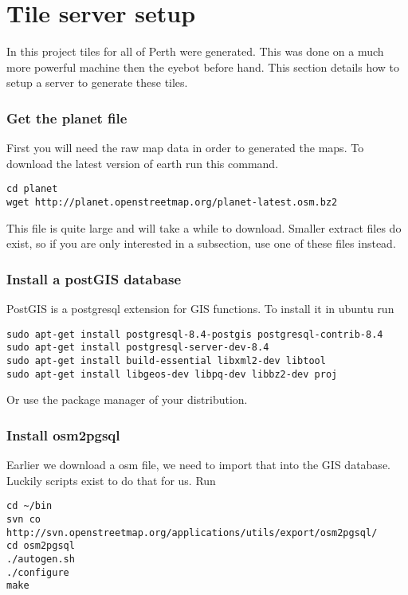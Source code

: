 \chapter{Tile server setup}
\label{app:sec:mapserver}
In this project tiles for all of Perth were generated. This was done on a much more powerful machine then the eyebot before hand. This section details how to setup a server to generate these tiles.

\subsection{Get the planet file}

First you will need the raw map data in order to generated the maps. To download the latest version of earth run this command.

\begin{verbatim}
cd planet
wget http://planet.openstreetmap.org/planet-latest.osm.bz2
\end{verbatim}

This file is quite large and will take a while to download. Smaller extract files do exist, so if you are only interested in a subsection, use one of these files instead.

\subsection{Install a postGIS database}

PostGIS is a postgresql extension for GIS functions. To install it in ubuntu run

\begin{verbatim}
sudo apt-get install postgresql-8.4-postgis postgresql-contrib-8.4
sudo apt-get install postgresql-server-dev-8.4
sudo apt-get install build-essential libxml2-dev libtool
sudo apt-get install libgeos-dev libpq-dev libbz2-dev proj
\end{verbatim}

Or use the package manager of your distribution.

\subsection{Install osm2pgsql}

Earlier we download a osm file, we need to import that into the GIS database. Luckily scripts exist to do that for us. Run

\begin{verbatim}
cd ~/bin
svn co http://svn.openstreetmap.org/applications/utils/export/osm2pgsql/
cd osm2pgsql
./autogen.sh
./configure
make
\end{verbatim}

